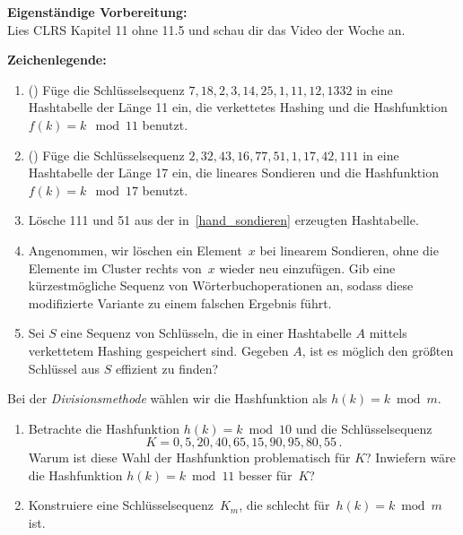 \documentclass{uebung_cs}
\begin{document}
\textbf{Eigenständige Vorbereitung:}\\
Lies  CLRS Kapitel 11 ohne 11.5 und schau dir das  Video der Woche an.

\textbf{Zeichenlegende:}
\legende{}


\begin{aufgabe}\label{tue-first}\mbox{}
	\begin{enumerate}
		\item (\warmup) Füge die Schlüsselsequenz $7, 18, 2, 3, 14, 25, 1, 11, 12, 1332$ in eine Hashtabelle der Länge 11 ein, die verkettetes Hashing und die Hashfunktion $f(k) = k \mod 11$ benutzt.
		      \item\label{hand_sondieren} (\warmup) Füge die Schlüsselsequenz $2, 32, 43, 16, 77, 51, 1, 17, 42, 111$ in eine Hashtabelle der Länge 17 ein, die lineares Sondieren und die Hashfunktion $f(k) = k \mod 17$ benutzt.
		\item Lösche 111 und 51 aus der in~\ref{hand_sondieren} erzeugten Hashtabelle.
		      \item\label{wrong_delete} Angenommen, wir löschen ein Element~$x$ bei linearem Sondieren, ohne die Elemente im Cluster rechts von~$x$ wieder neu einzufügen.
		      Gib eine kürzestmögliche Sequenz von Wörterbuchoperationen an, sodass diese modifizierte Variante zu einem falschen Ergebnis führt.
		\item Sei $S$ eine Sequenz von Schlüsseln, die in einer Hashtabelle $A$ mittels verkettetem Hashing gespeichert sind.
		      Gegeben $A$, ist es möglich den größten Schlüssel aus $S$ effizient zu finden?
	\end{enumerate}
\end{aufgabe}

\begin{aufgabe}
	Bei der \emph{Divisionsmethode} wählen wir die Hashfunktion als $h(k)=k\bmod m$.
	\begin{enumerate}
		\item Betrachte die Hashfunktion $h(k) = k \bmod 10$ und die Schlüsselsequenz \[K = 0, 5, 20, 40, 65, 15, 90, 95, 80, 55\,.\] Warum ist diese Wahl der Hashfunktion problematisch für $K$? Inwiefern wäre die Hashfunktion $h(k) = k \bmod 11$ besser für~$K$?
		\item Konstruiere eine Schlüsselsequenz~$K_m$, die schlecht für~$h(k) = k \bmod m$ ist.
	\end{enumerate}
\end{aufgabe}
\end{document}
